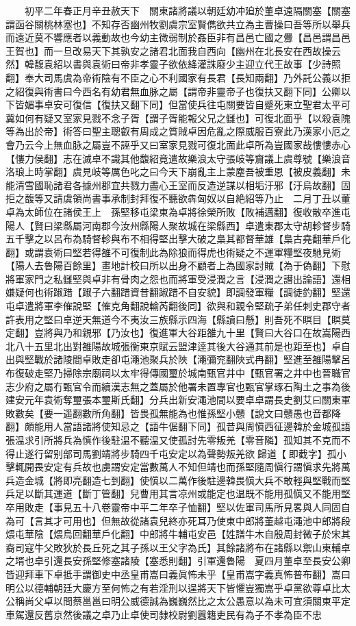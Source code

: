 　　初平二年春正月辛丑赦天下　關東諸將議以朝廷幼冲廹於董卓遠隔關塞【關塞謂函谷關桃林塞也】不知存否幽州牧劉虞宗室賢儁欲共立為主曹操曰吾等所以舉兵而遠近莫不響應者以義動故也今幼主微弱制於姦臣非有昌邑亡國之釁【昌邑謂昌邑王賀也】而一旦改易天下其孰安之諸君北面我自西向【幽州在北長安在西故操云然】韓馥袁紹以書與袁術曰帝非孝靈子欲依絳灌誅廢少主迎立代王故事【少詩照翻】奉大司馬虞為帝術陰有不臣之心不利國家有長君【長知兩翻】乃外託公義以拒之紹復與術書曰今西名有幼君無血脉之屬【謂帝非靈帝子也復扶又翻下同】公卿以下皆媚事卓安可復信【復扶又翻下同】但當使兵往屯關要皆自蹙死東立聖君太平可冀如何有疑又室家見戮不念子胥【謂子胥能報父兄之讎也】可復北面乎【以殺袁隗等為出於帝】術答曰聖主聰叡有周成之質賊卓因危亂之際威服百寮此乃漢家小厄之會乃云今上無血脉之屬豈不誣乎又曰室家見戮可復北面此卓所為豈國家哉慺慺赤心【慺力侯翻】志在滅卓不識其他馥紹竟遣故樂浪太守張岐等齎議上虞尊號【樂浪音洛琅上時掌翻】虞見岐等厲色叱之曰今天下崩亂主上蒙塵吾被重恩【被皮義翻】未能清雪國恥諸君各據州郡宜共戮力盡心王室而反造逆謀以相垢汙邪【汙烏故翻】固拒之馥等又請虞領尚書事承制封拜復不聽欲犇匈奴以自絶紹等乃止　二月丁丑以董卓為太師位在諸侯王上　孫堅移屯梁東為卓將徐榮所敗【敗補邁翻】復收散卒進屯陽人【賢曰梁縣屬河南郡今汝州縣陽人聚故城在梁縣西】卓遣東郡太守胡軫督步騎五千擊之以呂布為騎督軫與布不相得堅出擊大破之梟其都督華雄【梟古堯翻華戶化翻】或謂袁術曰堅若得雒不可復制此為除狼而得虎也術疑之不運軍糧堅夜馳見術【陽人去魯陽百餘里】畫地計校曰所以出身不顧者上為國家討賊【為于偽翻】下慰將軍家門之私讎堅與卓非有骨肉之怨也而將軍受浸潤之言【浸潤之譖出論語】還相嫌疑何也術踧踖【踧子六翻踖資昔翻踧踖不自安貌】即調發軍糧【調徒釣翻】堅還屯卓遣將軍李傕說堅【傕克角翻說輸芮翻後同】欲與和親令堅疏子弟任刺史郡守者許表用之堅曰卓逆天無道今不夷汝三族縣示四海【縣讀曰懸】則吾死不瞑目【瞑莫定翻】豈將與乃和親邪【乃汝也】復進軍大谷距雒九十里【賢曰大谷口在故嵩陽西北八十五里北出對雒陽故城張衡東京賦云盟津逹其後大谷通其前是也距至也】卓自出與堅戰於諸陵間卓敗走卻屯澠池聚兵於陜【澠彌兖翻陜式冉翻】堅進至雒陽擊呂布復破走堅乃掃除宗廟祠以太牢得傳國璽於城南甄官井中【甄官署之井中也晉職官志少府之屬冇甄官令而續漢志無之蓋屬於他署未置專官也甄官掌琢石陶土之事為後建安元年袁術奪璽張本璽斯氏翻】分兵出新安澠池間以要卓卓謂長史劉艾曰關東軍敗數矣【要一遥翻數所角翻】皆畏孤無能為也惟孫堅小戇【說文曰戇愚也音都降翻】頗能用人當語諸將使知忌之【語牛倨翻下同】孤昔與周愼西征邊韓於金城孤語張温求引所將兵為慎作後駐温不聽温又使孤討先零叛羌【零音隣】孤知其不克而不得止遂行留别部司馬劉靖將步騎四千屯安定以為聲勢叛羌欲歸道【即截字】孤小擊輒開畏安定有兵故也虜謂安定當數萬人不知但靖也而孫堅隨周愼行謂愼求先將萬兵造金城【將即亮翻造七到翻】使愼以二萬作後駐邊韓畏愼大兵不敢輕與堅戰而堅兵足以斷其運道【斷丁管翻】兒曹用其言凉州或能定也温既不能用孤愼又不能用堅卒用敗走【事見五十八卷靈帝中平二年卒子恤翻】堅以佐軍司馬所見畧與人同固自為可【言其才可用也】但無故從諸袁兒終亦死耳乃使東中郎將董越屯澠池中郎將段煨屯華陰【煨烏回翻華戶化翻】中郎將牛輔屯安邑【姓譜牛木自殷周封微子於宋其裔司寇牛父敗狄於長丘死之其子孫以王父字為氏】其餘諸將布在諸縣以禦山東輔卓之壻也卓引還長安孫堅修塞諸陵【塞悉則翻】引軍還魯陽　夏四月董卓至長安公卿皆迎拜車下卓抵手謂御史中丞皇甫嵩曰義眞怖未乎【皇甫嵩字義真怖普布翻】嵩曰明公以德輔朝廷大慶方至何怖之有若淫刑以逞將天下皆懼豈獨嵩乎卓黨欲尊卓比太公稱尚父卓以問蔡邕邕曰明公威德誠為巍巍然比之太公愚意以為未可宜須關東平定車駕還反舊京然後議之卓乃止卓使司隸校尉劉囂籍吏民有為子不孝為臣不忠
